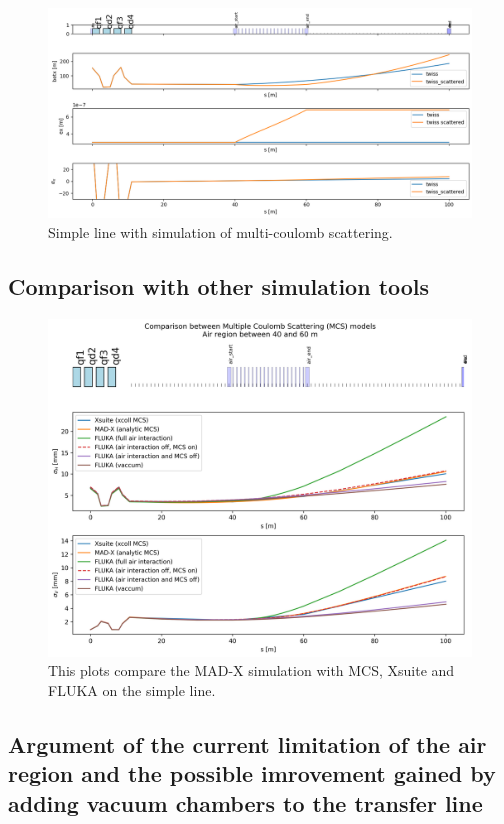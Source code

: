 \documentclass[a4paper,
               ]{jacow}
\begin{document}
\begin{figure}[!htb]
   \centering
   \includegraphics*[width=1.0\columnwidth]{air_scattering_1.png}
   \caption{Simple line with simulation of multi-coulomb scattering.}
   \label{fig:simple_line}
\end{figure}

\subsection{Comparison with other simulation tools}

\begin{figure}[!htb]
   \centering
   \includegraphics*[width=1.0\columnwidth]{compare_simulation.png}
   \caption{This plots compare the MAD-X simulation with MCS, Xsuite and FLUKA on the simple line.}
   \label{fig:simple_line}
\end{figure}

\subsection{Argument of the current limitation of the air region and the possible imrovement gained by adding vacuum chambers to the transfer line}
\end{document}
